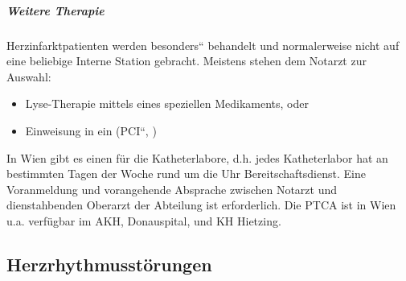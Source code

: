 \subparagraph{Weitere Therapie}

Herzinfarktpatienten werden {\quotedblbase}besonders{\textquotedblleft}
behandelt und normalerweise nicht auf eine beliebige Interne Station
gebracht. Meistens stehen dem Notarzt zur Auswahl:

\begin{itemize}
	\item Lyse-Therapie mittels eines speziellen Medikaments, oder
	\item Einweisung in ein 
	({\quotedblbase}PCI{\textquotedblleft},
	{\quotedblbase}
	)

\end{itemize}

In Wien gibt es einen  f\"ur die Katheterlabore, d.h. 
jedes Katheterlabor hat an bestimmten Tagen der Woche rund um die 
Uhr Bereitschaftsdienst. Eine Voranmeldung und vorangehende Absprache 
zwischen Notarzt und dienstahbenden Oberarzt der Abteilung ist erforderlich. 
Die PTCA ist in Wien u.a. verf\"ugbar im AKH, Donauspital, und KH Hietzing.


\subsection{Herzrhythmusst\"orungen }

